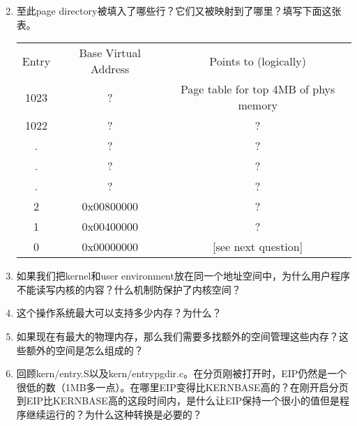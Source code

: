 \begin{questionEnv}
    \begin{enumerate}
        \setcounter{enumi}{1}
    \item 至此page directory被填入了哪些行？它们又被映射到了哪里？填写下面这张表。
        \begin{center}
            \begin{tabular}{c c c}
                \toprule
                Entry & Base Virtual Address & Points to (logically) \\
                \cmidrule(lr){1-3}
                1023 & ? & Page table for top 4MB of phys memory \\
                1022 & ?          & ? \\
                .    & ?          & ? \\
                .    & ?          & ? \\
                .    & ?          & ? \\
                2    & 0x00800000 & ? \\
                1    & 0x00400000 & ? \\
                0    & 0x00000000 & [see next question] \\
                \bottomrule
            \end{tabular}
        \end{center}
    \item 如果我们把kernel和user environment放在同一个地址空间中，为什么用户程序不能读写内核的内容？什么机制防保护了内核空间？
    \item 这个操作系统最大可以支持多少内存？为什么？
    \item 如果现在有最大的物理内存，那么我们需要多找额外的空间管理这些内存？这些额外的空间是怎么组成的？
    \item 回顾kern/entry.S以及kern/entrypgdir.c。在分页刚被打开时，EIP仍然是一个很低的数（1MB多一点）。在哪里EIP变得比KERNBASE高的？在刚开启分页到EIP比KERNBASE高的这段时间内，是什么让EIP保持一个很小的值但是程序继续运行的？为什么这种转换是必要的？
\end{enumerate}
\end{questionEnv}
